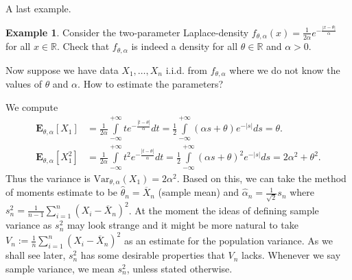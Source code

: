 \documentclass[preprint,  11pt]{amsart}
\newcommand{\para}[1]{\vspace{4mm}\noindent{\bfseries #1:}}
\theoremstyle{plain} %
\theoremstyle{definition} %
\newtheorem{example}[theorem]{Example}
\begin{document}
A last example.
\begin{example} Consider the two-parameter Laplace-density $f_{\theta,\alpha}(x)=\frac{1}{2\alpha}e^{-\frac{|x-\theta|}{\alpha}}$ for all $x\in \mathbb{R}$.  Check that $f_{\theta,\alpha}$ is indeed a density for all $\theta\in \mathbb{R}$ and $\alpha>0$.

Now suppose we have data $X_{1},\ldots ,X_{n}$ i.i.d. from $f_{\theta,\alpha}$ where we do not know the values of $\theta$ and $\alpha$. How to estimate the parameters?

\para{Method of moments} We compute
\begin{align*}
\mathbf{E}_{\theta,\alpha}[X_{1}]&=\frac{1}{2\alpha}\int\limits_{-\infty}^{+\infty}te^{-\frac{|t-\theta|}{\alpha}}dt = \frac{1}{2}\int\limits_{-\infty}^{+\infty}(\alpha s+\theta) e^{-|s|}ds = \theta.\\
\mathbf{E}_{\theta,\alpha}[X_{1}^{2}]&=\frac{1}{2\alpha}\int\limits_{-\infty}^{+\infty}t^{2}e^{-\frac{|t-\theta|}{\alpha}}dt = \frac{1}{2}\int\limits_{-\infty}^{+\infty}(\alpha s+\theta)^{2} e^{-|s|}ds = 2\alpha^{2}+\theta^{2}.
\end{align*}
Thus the variance is $\mbox{Var}_{\theta,\alpha}(X_{1})=2\alpha^{2}$. Based on this, we can take the method of moments estimate to be $\hat{\theta}_{n}=\overline{X}_{n}$ (sample mean) and $\hat{\alpha}_{n}=\frac{1}{\sqrt{2}}s_{n}$ where $s_{n}^{2}=\frac{1}{n-1}\sum_{i=1}^{n}(X_{i}-\overline{X}_{n})^{2}$. At the moment the ideas of defining sample variance as $s_{n}^{2}$ may look strange and it might be more natural to take $V_{n}:=\frac{1}{n}\sum_{i=1}^{n}(X_{i}-\overline{X}_{n})^{2}$ as an estimate for the population variance. As we shall see later, $s_{n}^{2}$ has some desirable properties that $V_{n}$ lacks. Whenever we say sample variance, we mean $s_{n}^{2}$, unless stated otherwise.


\end{example}
\end{document}
